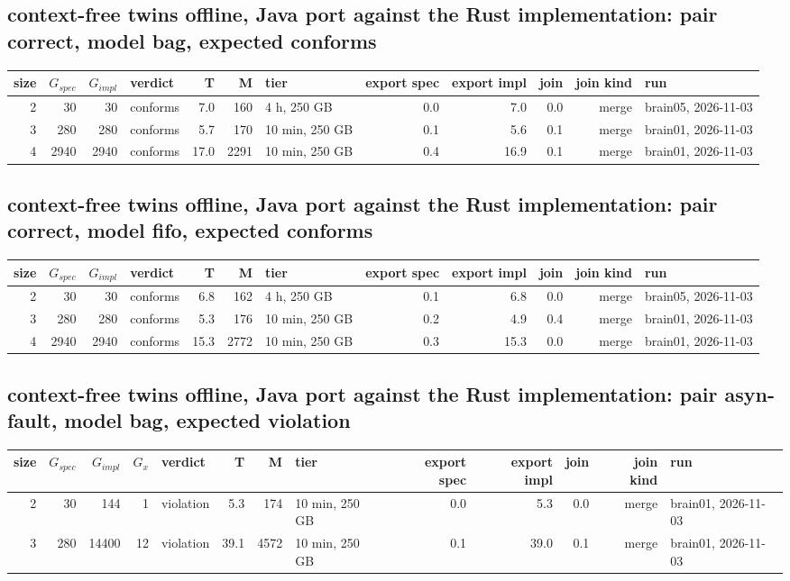 \documentclass[10pt]{article}
\begin{document}
\subsection*{context-free twins offline, Java port against the Rust implementation: pair \textsf{correct}, model bag, expected conforms}
\begin{longtable}{@{}rrrlrrlrrrrl@{}}
\toprule
size & $G_{\mathit{spec}}$ & $G_{\mathit{impl}}$ & verdict & T & M & tier & export spec & export impl & join & join kind & run \\
\midrule
\endhead
\color{blue} 2 & 30 & 30 & conforms & 7.0 & 160 & 4 h, 250 GB & 0.0 & 7.0 & 0.0 & merge & brain05, 2026-11-03 \\
\color{blue} 3 & 280 & 280 & conforms & 5.7 & 170 & 10 min, 250 GB & 0.1 & 5.6 & 0.1 & merge & brain01, 2026-11-03 \\
\color{blue} 4 & 2940 & 2940 & conforms & 17.0 & 2291 & 10 min, 250 GB & 0.4 & 16.9 & 0.1 & merge & brain01, 2026-11-03 \\
\bottomrule
\end{longtable}
\subsection*{context-free twins offline, Java port against the Rust implementation: pair \textsf{correct}, model fifo, expected conforms}
\begin{longtable}{@{}rrrlrrlrrrrl@{}}
\toprule
size & $G_{\mathit{spec}}$ & $G_{\mathit{impl}}$ & verdict & T & M & tier & export spec & export impl & join & join kind & run \\
\midrule
\endhead
\color{blue} 2 & 30 & 30 & conforms & 6.8 & 162 & 4 h, 250 GB & 0.1 & 6.8 & 0.0 & merge & brain05, 2026-11-03 \\
\color{blue} 3 & 280 & 280 & conforms & 5.3 & 176 & 10 min, 250 GB & 0.2 & 4.9 & 0.4 & merge & brain01, 2026-11-03 \\
\color{blue} 4 & 2940 & 2940 & conforms & 15.3 & 2772 & 10 min, 250 GB & 0.3 & 15.3 & 0.0 & merge & brain01, 2026-11-03 \\
\bottomrule
\end{longtable}
\subsection*{context-free twins offline, Java port against the Rust implementation: pair \textsf{asyn-fault}, model bag, expected violation}
\begin{longtable}{@{}rrrrlrrlrrrrl@{}}
\toprule
size & $G_{\mathit{spec}}$ & $G_{\mathit{impl}}$ & $G_x$ & verdict & T & M & tier & export spec & export impl & join & join kind & run \\
\midrule
\endhead
\color{blue} 2 & 30 & 144 & 1 & violation & 5.3 & 174 & 10 min, 250 GB & 0.0 & 5.3 & 0.0 & merge & brain01, 2026-11-03 \\
\color{blue} 3 & 280 & 14400 & 12 & violation & 39.1 & 4572 & 10 min, 250 GB & 0.1 & 39.0 & 0.1 & merge & brain01, 2026-11-03 \\
\bottomrule
\end{longtable}
\end{document}
